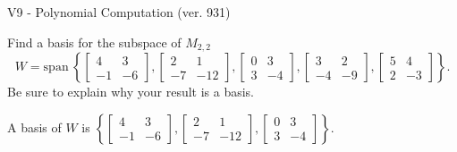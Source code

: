 \begin{exercise}
  \begin{exerciseTitle}V9 - Polynomial Computation (ver. 931)\end{exerciseTitle}
  \begin{exerciseStatement}
    Find a basis for the subspace of \(M_{2,2}\) 
\[W=\mathrm{span}\ \left\{\left[\begin{array}{cc}
4 & 3 \\
-1 & -6
\end{array}\right] , \left[\begin{array}{cc}
2 & 1 \\
-7 & -12
\end{array}\right] , \left[\begin{array}{cc}
0 & 3 \\
3 & -4
\end{array}\right] , \left[\begin{array}{cc}
3 & 2 \\
-4 & -9
\end{array}\right] , \left[\begin{array}{cc}
5 & 4 \\
2 & -3
\end{array}\right]\right\}.\]
 Be sure to explain why your result is a basis.


  \end{exerciseStatement}
  \begin{exerciseAnswer}
   A basis of \(W\) is  \(\left\{\left[\begin{array}{cc}
4 & 3 \\
-1 & -6
\end{array}\right] , \left[\begin{array}{cc}
2 & 1 \\
-7 & -12
\end{array}\right] , \left[\begin{array}{cc}
0 & 3 \\
3 & -4
\end{array}\right]\right\}\).
  


  \end{exerciseAnswer}
\end{exercise}